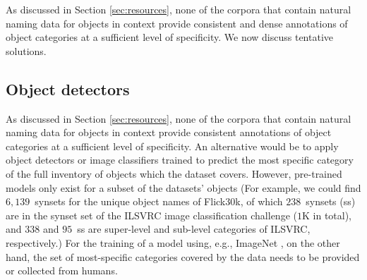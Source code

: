 \documentclass[runningheads]{llncs}
\newcommand{\refcoco}{RefCOCO\xspace}
\newcommand{\flickr}{Flickr30k Entities\xspace}
\begin{document}
As discussed in Section \ref{sec:resources}, none of the corpora that contain natural naming data for objects in context provide consistent and dense annotations of object categories at a sufficient level of specificity. We now discuss tentative solutions.

\subsection{Object detectors}
As discussed in Section \ref{sec:resources}, none of the corpora that contain natural naming data for objects in context provide consistent annotations of object categories at a sufficient level of specificity.
An alternative would be to apply object detectors or image classifiers trained to predict the most specific category of the full inventory of objects which the dataset covers. 
However, pre-trained models only exist for a subset of the datasets' objects  (For example, we could find $6,139$~synsets for the unique object names of Flick30k, of which $238$~synsets (ss) are in the synset set of the ILSVRC image classification challenge ($1$K in total), and $338$ and $95$~ss are super-level and sub-level categories of ILSVRC, respectively.)
For the training of a model using, e.g., ImageNet \cite{imagenet_cvpr09}, on the other hand, the  set of most-specific categories covered by the data needs to be provided or collected from humans. 

%
%
\end{document}

